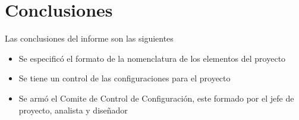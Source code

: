 
\chapter{Conclusiones}
\label{intro}

Las conclusiones del informe son las siguientes



\begin{itemize}
\item Se especificó el formato de la nomenclatura de los elementos del proyecto
\item Se tiene un control de las configuraciones para el proyecto
\item Se armó el Comite de Control de Configuración, este formado por el jefe de proyecto, analista y diseñador
\end{itemize}


\cleardoublepage